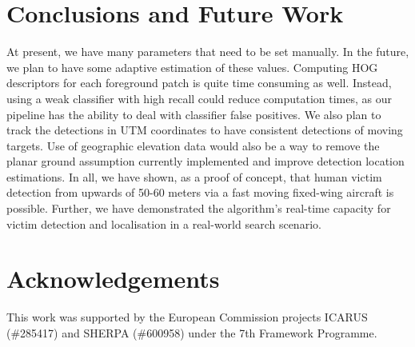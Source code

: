 \documentclass[runningheads]{llncs}
\begin{document}
\section{Conclusions and Future Work}

At present, we have many parameters that need to be set manually. In the future, we plan to have some adaptive estimation of these values. Computing HOG descriptors for each foreground patch is quite time consuming as well. Instead, using a weak classifier with high recall could reduce computation times, as our pipeline has the ability to deal with classifier false positives. We also plan to track the detections in UTM coordinates to have consistent detections of moving targets. Use of geographic elevation data would also be a way to remove the planar ground assumption currently implemented and improve detection location estimations. In all, we have shown, as a proof of concept, that human victim detection from upwards of 50-60 meters via a fast moving fixed-wing aircraft is possible. Further, we have demonstrated the algorithm's real-time capacity for victim detection and localisation in a real-world search scenario.

\section*{Acknowledgements}

This work was supported by the European Commission projects ICARUS (\#285417) and SHERPA (\#600958) under the 7th Framework Programme.

\nocite{bal:cha:gra:pae}


\end{document}
